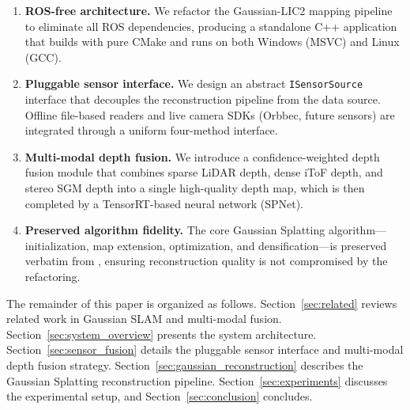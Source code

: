 \begin{enumerate}
    \item \textbf{ROS-free architecture.} We refactor the Gaussian-LIC2
    mapping pipeline to eliminate all ROS dependencies, producing a
    standalone C++ application that builds with pure CMake and runs on
    both Windows (MSVC) and Linux (GCC).

    \item \textbf{Pluggable sensor interface.} We design an abstract
    \texttt{ISensorSource} interface that decouples the reconstruction
    pipeline from the data source. Offline file-based readers and live
    camera SDKs (Orbbec, future sensors) are integrated through a uniform
    four-method interface.

    \item \textbf{Multi-modal depth fusion.} We introduce a
    confidence-weighted depth fusion module that combines sparse LiDAR
    depth, dense iToF depth, and stereo SGM depth into a single
    high-quality depth map, which is then completed by a TensorRT-based
    neural network (SPNet).

    \item \textbf{Preserved algorithm fidelity.} The core Gaussian
    Splatting algorithm---initialization, map extension, optimization,
    and densification---is preserved verbatim from \gaussianlic, ensuring
    reconstruction quality is not compromised by the refactoring.
\end{enumerate}

The remainder of this paper is organized as follows.
Section~\ref{sec:related} reviews related work in Gaussian SLAM and
multi-modal fusion.
Section~\ref{sec:system_overview} presents the system architecture.
Section~\ref{sec:sensor_fusion} details the pluggable sensor interface
and multi-modal depth fusion strategy.
Section~\ref{sec:gaussian_reconstruction} describes the Gaussian
Splatting reconstruction pipeline.
Section~\ref{sec:experiments} discusses the experimental setup, and
Section~\ref{sec:conclusion} concludes.
